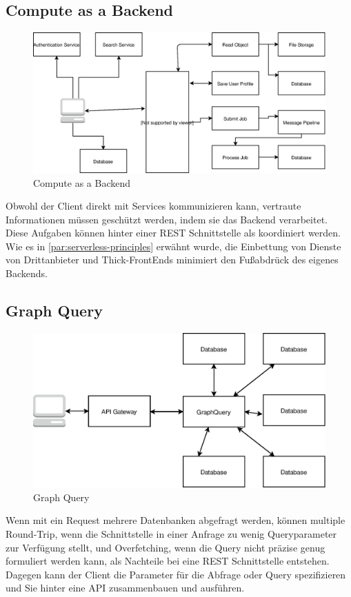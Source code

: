 \documentclass[
12pt,
english,
ngerman,
headsepline,
twoside,
openright,
numbers=noenddot,version=first
]{scrreprt}
\begin{document}
\subsection{Compute as a Backend}
\begin{figure}
	\includegraphics[scale=0.36]{./pics/compute-as-a-backend.eps}
	\caption{Compute as a Backend}
	\label{pic:compute-backend}
\end{figure}
Obwohl der Client direkt mit Services kommunizieren kann, vertraute Informationen müssen geschützt werden, indem sie das Backend verarbeitet\cite{serverlessArchAWS}. Diese Aufgaben können hinter einer \acrshort{REST} Schnittstelle als koordiniert werden. Wie es in \autoref{par:serverless-principles} erwähnt wurde, die Einbettung von Dienste von Drittanbieter und Thick-FrontEnds minimiert den Fußabdrück des eigenes Backends.

\subsection{Graph Query}
\begin{figure}
	\includegraphics[scale=0.36]{./pics/GraphQuery.eps}
	\caption{Graph Query}
	\label{pic:graph-query}
\end{figure}
Wenn mit ein Request mehrere Datenbanken abgefragt werden, können multiple Round-Trip, wenn die Schnittstelle in einer Anfrage zu wenig Queryparameter zur Verfügung stellt, und Overfetching, wenn die Query nicht präzise genug formuliert werden kann, als Nachteile bei eine \acrshort{REST} Schnittstelle entstehen. Dagegen kann der Client die Parameter für die Abfrage oder Query spezifizieren und Sie hinter eine \acrshort{API} zusammenbauen und ausführen. 
\end{document}
